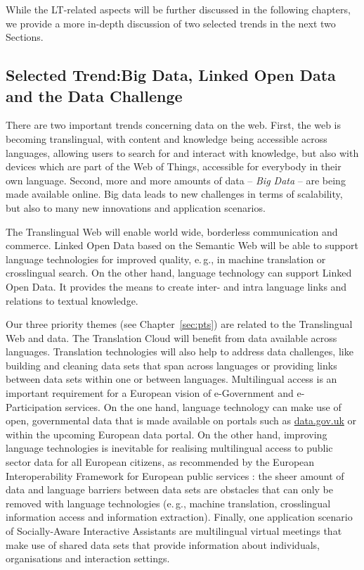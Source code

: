 \documentclass[10pt, plain]{../../metanetpaper}
\begin{document}
\begin{multicols}{2}
While the LT-related aspects will be further discussed in the following chapters, we provide a more in-depth discussion of two selected trends in the next two Sections.

\subsection[Selected Trend: Big Data, Linked Open Data and the Data Challenge]{Selected Trend:\newline Big Data, Linked Open Data and the Data Challenge}
\label{sec:linked-data-open}

There are two important trends concerning data on the web. First, the web is becoming translingual, with content and knowledge being accessible across languages, allowing users to search for and interact with knowledge, but also with devices which are part of the Web of Things, accessible for everybody in their own language. Second, more and more amounts of data -- \emph{Big Data} -- are being made available online. Big data leads to new challenges in terms of scalability, but also to many new innovations and application scenarios. 

The Translingual Web will enable world wide, borderless communication and commerce. Linked Open Data based on the Semantic Web will be able to support language technologies for improved quality, e.\,g., in machine translation or crosslingual search. On the other hand, language technology can support Linked Open Data. It provides the means to create inter- and intra language links and relations to textual knowledge.

Our three priority themes (see Chapter~\ref{sec:pts}) are related to the Translingual Web and data. The Translation Cloud will benefit from data available across languages. Translation technologies will also help to address data challenges, like building and cleaning data sets that span across languages or providing links between data sets within one or between languages. Multilingual access is an important requirement for a European vision of e-Government and e-Participation services. On the one hand, language technology can make use of open, governmental data that is made available on portals such as \url{data.gov.uk} or within the upcoming European data portal. On the other hand, improving language technologies is inevitable for realising multilingual access to public sector data for all European citizens, as recommended by the European Interoperability Framework for European public services \cite{EIF2010}: the sheer amount of data and language barriers between data sets are obstacles that can only be removed with language technologies (e.\,g., machine translation, crosslingual information access and information extraction). Finally, one application scenario of Socially-Aware Interactive Assistants are multilingual virtual meetings that make use of shared data sets that provide information about individuals, organisations and interaction settings. 
 

\end{multicols}
\end{document}
